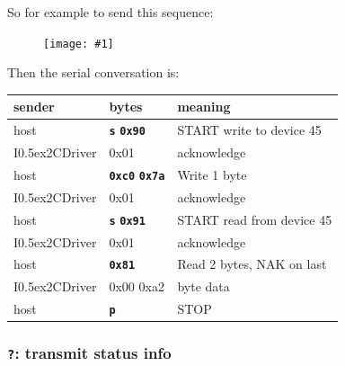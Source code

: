 \documentclass{article}
\newcommand{\two}{\raise0.5ex\hbox{\footnotesize{2}}}
\newcommand{\iic}{I\two{}C}
\newcommand{\iicdriver}{I\two{}CDriver}
\newcommand{\png}[1]{
\begin{figure}[H]
\begin{center}
\texttt{[image: \#1]}
\end{center}
\end{figure}
}
\newcommand{\mach}[1]{\texttt{\textbf{#1}}}
\newcommand{\gap}{\vspace{10pt}}
\begin{document}
So for example to send this sequence:

\png{img/i2cdriver/hero3}

Then the serial conversation is:


\gap\begin{tabular}{lll}
sender & bytes & meaning \\ \hline
host & \mach{s} \mach{0x90}    & START write to device 45 \\
\rowcolor{Gray}
\iicdriver{} & 0x01 & acknowledge \\
host & \mach{0xc0} \mach{0x7a} & Write 1 byte \\
\rowcolor{Gray}
\iicdriver{} & 0x01 & acknowledge \\
host & \mach{s} \mach{0x91}    & START read from device 45 \\
\rowcolor{Gray}
\iicdriver{} & 0x01 & acknowledge \\
host & \mach{0x81}          & Read 2 bytes, NAK on last \\
\rowcolor{Gray}
\iicdriver{} & 0x00 0xa2 & byte data \\
host & \mach{p}             & STOP \\
\end{tabular}\gap

\newcommand{\byteseq}[1]{%
\gap
\begin{bytefield}[endianness=big,bitwidth=3.2em]{8}
  \bitheader{0-7} \\
  #1
\end{bytefield}
}

\newcommand{\ackfield}{%
\byteseq{
  \bitbox{1}{0}
  \bitbox{1}{0}
  \bitbox{1}{1}
  \bitbox{1}{1}
  \bitbox{1}{0}
  \bitbox{1}{ARB}
  \bitbox{1}{TO}
  \bitbox{1}{ACK}
}

\textbf{ARB} is set if bus arbitration is lost during the transmission

\textbf{TO} is set if the transmission times out

\textbf{ACK} is set if the \iic{} device acknowledged the transmission

}
\newcommand{\ackbyte}{%
The single byte response is:

\ackfield
}

\subsubsection{\mach{?}: transmit status info}

\byteseq{
  \bitbox{8}{\mach{?} (0x3f)}\\
}
\end{document}

